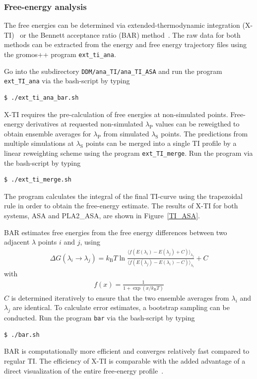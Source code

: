 \subsubsection{Free-energy analysis}
The free energies can be determined via extended-thermodynamic integration (X-TI)~\cite{X_TI} or the Bennett acceptance ratio (BAR) method~\cite{bar}. The raw data for both methods can be extracted from the energy and free energy trajectory files using the gromos++ program \texttt{ext\_ti\_ana}. 

Go into the subdirectory \texttt{DDM/ana\_TI/ana\_TI\_ASA} and run the program \texttt{ext\_TI\_ana} via the bash-script by typing
\begin{lstlisting}
$ ./ext_ti_ana_bar.sh
\end{lstlisting}
%
X-TI requires the pre-calculation of free energies at non-simulated points. Free-energy derivatives at requested non-simulated $\lambda_{\text{P}}$ values can be reweigthed to obtain ensemble averages for $\lambda_{\text{P}}$ from simulated $\lambda_{\text{S}}$ points. The predictions from multiple simulations at $\lambda_{\text{S}}$ points can be merged into a single TI profile by a linear reweighting scheme using the program \texttt{ext\_TI\_merge}. 
Run the program via the bash-script by typing
\begin{lstlisting}
$ ./ext_ti_merge.sh
\end{lstlisting}
%
The program calculates the integral of the final TI-curve using the trapezoidal rule in order to obtain the free-energy estimate. The results of X-TI for both systems, ASA and PLA2\_ASA, are shown in Figure~\ref{TI_ASA}.  


BAR estimates free energies from the free energy differences between two adjacent $\lambda$ points $i$ and $j$, using
\begin{align}
\Delta G(\lambda_i \rightarrow \lambda_j) 
     = k_{\text{B}} T \ln \frac{\langle f(E(\lambda_i) - E(\lambda_j) + C)\rangle_{\lambda_j}}
          {\langle f(E(\lambda_j)-E(\lambda_i) - C )\rangle_{\lambda_i}}  + C
\end{align}
with
\begin{align}
f(x) = \frac{1}{1+\exp(x/k_{\text{B}} T)}
\end{align}
$C$ is determined iteratively to ensure that the two ensemble averages
from $\lambda_i$ and $\lambda_j$ are identical. To calculate error estimates, a
bootstrap sampling can be conducted. Run the program \texttt{bar} via
the bash-script by typing
\begin{lstlisting}
$ ./bar.sh 
\end{lstlisting}
%
BAR is computationally more efficient and converges relatively fast compared to regular TI. The efficiency of X-TI is comparable with the added advantage of a direct visualization of the entire free-energy profile~\cite{Maurer}.

